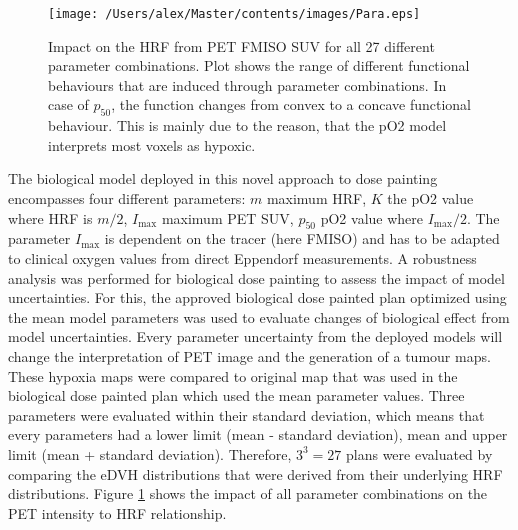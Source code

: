 \begin{figure}[htb]
\centering
\texttt{[image: /Users/alex/Master/contents/images/Para.eps]}
\vspace{1cm}
\caption{Impact on the HRF from PET FMISO SUV for all 27 different parameter combinations. Plot shows the range of different functional behaviours that are induced through parameter combinations. In case of $p_{50}$, the function changes from convex to a concave functional behaviour. This is mainly due to the reason, that the pO2 model interprets most voxels as hypoxic.}
\label{fig:para}
\end{figure}
The biological model deployed in this novel approach to dose painting encompasses four different parameters: $m$ maximum HRF, $K$ the pO2 value where HRF is $m/2$, $I_\mathrm{max}$ maximum PET SUV, $p_{50}$ pO2 value where $I_\mathrm{max}/2$. The parameter $I_\mathrm{max}$ is dependent on the tracer (here FMISO) and has to be adapted to clinical oxygen values from direct Eppendorf measurements. A robustness analysis was performed for biological dose painting to assess the impact of model uncertainties. For this, the approved biological dose painted plan optimized using the mean model parameters was used to evaluate changes of biological effect from model uncertainties. Every parameter uncertainty from the deployed models will change the interpretation of PET image and the generation of a tumour maps. These hypoxia maps were compared to original map that was used in the biological dose painted plan which used the mean parameter values. Three parameters were evaluated within their standard deviation, which means that every parameters had a lower limit (mean - standard deviation), mean and upper limit (mean + standard deviation). Therefore, $3^3=27$ plans were evaluated by comparing the eDVH distributions that were derived from their underlying HRF distributions. Figure \ref{fig:para} shows the impact of all parameter combinations on the PET intensity to HRF relationship.
